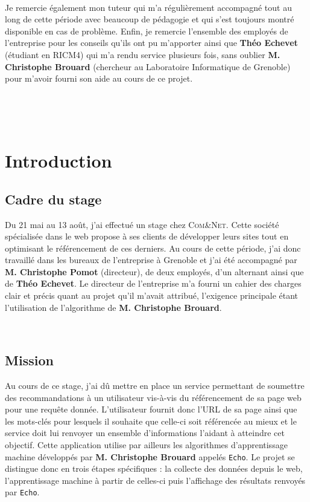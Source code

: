 \documentclass[12pt]{article}
\begin{document}
\

Je remercie également mon tuteur qui m’a régulièrement accompagné tout au long de cette période avec beaucoup de pédagogie et qui s'est toujours montré disponible en cas de problème. Enfin, je remercie l’ensemble des employés de l'entreprise pour les conseils qu’ils ont pu m'apporter ainsi que \textbf{Théo Echevet} (étudiant en RICM4) qui m'a rendu service plusieurs fois, sans oublier \textbf{M. Christophe Brouard} (chercheur au Laboratoire Informatique de Grenoble) pour m'avoir fourni son aide au cours de ce projet.

\

\


\newpage
\section{Introduction}

\subsection{Cadre du stage}

Du 21 mai au 13 août, j'ai effectué un stage chez  \textsc{Com\&Net}. Cette société spécialisée dans le web propose à ses clients de développer leurs sites tout en optimisant le référencement de ces derniers. Au cours de cette période, j'ai donc travaillé dans les bureaux de l'entreprise à Grenoble et j'ai été accompagné par \textbf{M. Christophe Pomot} (directeur), de deux employés, d'un alternant ainsi que de \textbf{Théo Echevet}. Le directeur de l'entreprise m'a fourni un cahier des charges clair et précis quant au projet qu'il m'avait attribué, l'exigence principale étant l'utilisation de l'algorithme de \textbf{M. Christophe Brouard}.

\

\subsection{Mission}

Au cours de ce stage, j'ai dû mettre en place un service permettant de soumettre des recommandations à un utilisateur vis-à-vis du référencement de sa page web pour une requête donnée. L'utilisateur fournit donc l'URL de sa page ainsi que les mots-clés pour lesquels il souhaite que celle-ci soit référencée au mieux et le service doit lui renvoyer un ensemble d'informations l'aidant à atteindre cet objectif. Cette application utilise par ailleurs les algorithmes d'apprentissage machine développés par \textbf{M. Christophe Brouard} appelés \texttt{Echo}. Le projet se distingue donc en trois étapes spécifiques : la collecte des données depuis le web, l'apprentissage machine à partir de celles-ci puis l'affichage des résultats renvoyés par \texttt{Echo}. 
\end{document}
